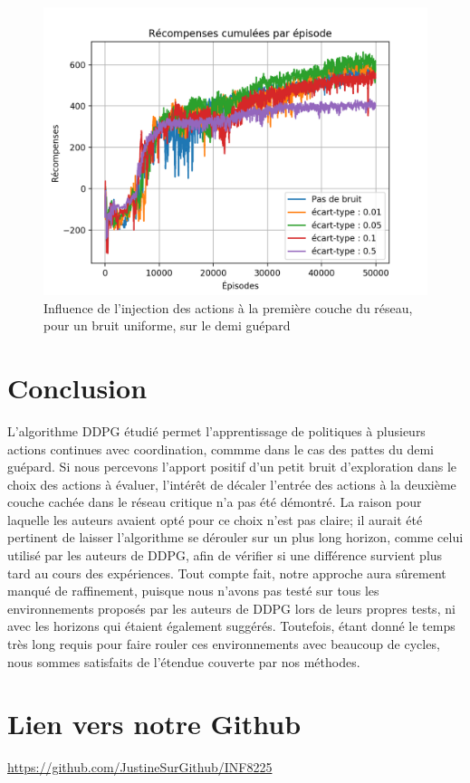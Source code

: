 \documentclass[letterpaper, french]{article}
\begin{document}
\begin{figure}
\begin{center}
\includegraphics[scale=0.5]{assiettes/halfCheetah_uniform_action_input.png}
\caption{Influence de l'injection des actions à la première couche du réseau, pour un bruit uniforme, sur le demi guépard}
\label{reseau2}
\end{center}
\end{figure}



\section{Conclusion}
L'algorithme DDPG étudié permet l'apprentissage de politiques à plusieurs actions continues avec coordination, commme dans le cas des pattes du demi guépard. Si nous percevons l'apport positif d'un petit bruit d'exploration dans le choix des actions à évaluer, l'intérêt de décaler l'entrée des actions à la deuxième couche cachée dans le réseau critique n'a pas été démontré. La raison pour laquelle les auteurs avaient opté pour ce choix n'est pas claire; il aurait été pertinent de laisser l'algorithme se dérouler sur un plus long horizon, comme celui utilisé par les auteurs de DDPG, afin de vérifier si une différence survient plus tard au cours des expériences. Tout compte fait, notre approche aura sûrement manqué de raffinement, puisque nous n'avons pas testé sur tous les environnements proposés par les auteurs de DDPG lors de leurs propres tests, ni avec les horizons qui étaient également suggérés. Toutefois, étant donné le temps très long requis pour faire rouler ces environnements avec beaucoup de cycles, nous sommes satisfaits de l'étendue couverte par nos méthodes.

\section{Lien vers notre Github}
\url{https://github.com/JustineSurGithub/INF8225}
 
 
\end{document}
